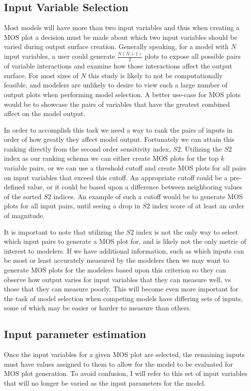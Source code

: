 \subsection{Input Variable Selection\label{sec:inp_var_sel}}
Most models will have more than two input variables and thus when creating a MOS plot a decision must be made about which two input variables should be varied during output surface creation. Generally speaking, for a model with $N$ input variables, a user could generate $\frac{N(N+1)}{2}$ plots to expose all possible pairs of variable interactions and examine how those interactions affect the output surface. For most sizes of $N$ this study is likely to not be computationally feasible, and modelers are unlikely to desire to view such a large number of output plots when performing model selection. A better use-case for MOS plots would be to showcase the pairs of variables that have the greatest combined affect on the model output.

In order to accomplish this task we need a way to rank the pairs of inputs in order of how greatly they affect model output. Fortunately we can attain this ranking directly from the second order sensitivity index, $S2$. Utilizing the $S2$ index as our ranking schema we can either create MOS plots for the top $k$ variable pairs, or we can use a threshold cutoff and create MOS plots for all pairs on input variables that exceed this cutoff. An appropriate cutoff could be a pre-defined value, or it could be based upon a difference between neighboring values of the sorted $S2$ indices. An example of such a cutoff would be to generate MOS plots for all input pairs, until seeing a drop in $S2$ index score of at least an order of magnitude.

It is important to note that utilizing the $S2$ index is not the only way to select which input pairs to generate a MOS plot for, and is likely not the only metric of interest to modelers. If we have additional information, such as which inputs can be most or least accurately measured by the modelers then we may want to generate MOS plots for the modelers based upon this criterion so they can observe how output varies for input variables that they can measure well, vs those that they can measure poorly. This will become even more important for the task of model selection when competing models have differing sets of inputs, some of which may be easier or harder to measure than others.

\subsection{Input parameter estimation\label{sec:inp_param_est}}
Once the input variables for a given MOS plot are selected, the remaining inputs must have values assigned to them to allow for the model to be evaluated for MOS plot generation. To avoid confusion, I will refer to this set of input variables that will no longer be varied as the input parameters for the model.

